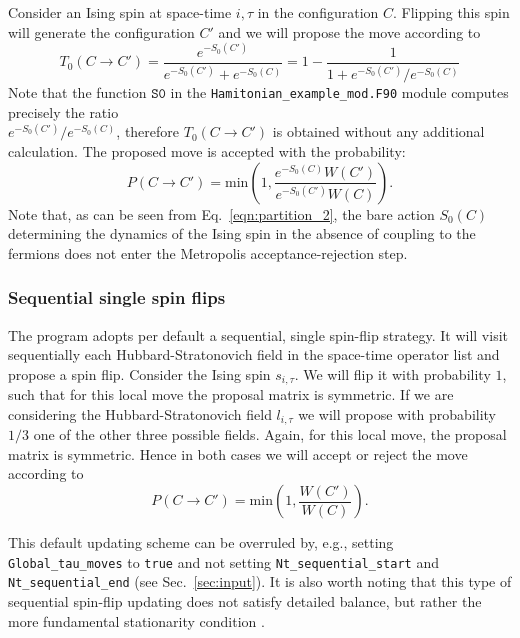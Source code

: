 Consider an Ising spin at space-time $i,\tau$ in the configuration $C$. Flipping this spin will generate the configuration $C'$ and we will propose the move according to 
  \begin{equation}
 T_0(C \rightarrow C')  =  \frac{e^{-S_0(C')}}{ e^{-S_0(C')} + e^{-S_0(C)} }   = 1 - \frac{1}{1 +  e^{-S_0(C')} /e^{-S_0(C)}}
  \end{equation}
 Note that the function $\texttt{S0}$ in the  \texttt{Hamitonian\_example\_mod.F90}  module  computes precisely the ratio\\
 ${e^{-S_0(C')} /e^{-S_0(C)}}$, therefore $T_0(C \rightarrow C') $ is obtained without any additional calculation. 
 The proposed move is accepted with the probability: 
 \begin{equation}
 P(C \rightarrow C') =  \text{min}  \left( 1,  \frac{e^{-S_0(C)}   W(C')}{ e^{-S_0(C')} W(C)} \right).
 \end{equation}
 Note that, as can be seen from Eq.~\eqref{eqn:partition_2}, the bare action $S_0(C)$  determining the  dynamics of the Ising spin  in the absence of coupling to the fermions  does not enter the Metropolis acceptance-rejection step.
% 
\subsubsection{Sequential single spin flips}
%

The program adopts per default a sequential, single spin-flip strategy. It will  visit sequentially each Hubbard-Stratonovich field in the space-time operator list and  propose a spin flip. Consider  the Ising spin $s_{i,\tau}$. We will flip it with probability $1$, such that for  this local move  the  proposal matrix is symmetric.  If we are considering the Hubbard-Stratonovich field $l_{i,\tau}$  we will propose with probability $1/3$ one  of the other three  possible fields.   Again, for this local move, the proposal matrix is symmetric.  Hence in both cases we will accept or reject the move according to 
 \begin{equation}
 	P(C \rightarrow C') =  \text{min}  \left( 1, \frac{ W(C')}{W(C)} \right).
 \end{equation}

This default updating scheme can be overruled by, e.g., setting \texttt{Global\_tau\_moves} to \texttt{true} and not setting \texttt{Nt\_sequential\_start} and \texttt{Nt\_sequential\_end} (see Sec.~\ref{sec:input}).
It is also worth noting that this type of sequential spin-flip updating does not satisfy detailed balance, but rather the more fundamental stationarity condition \cite{Sokal89}. 
 
